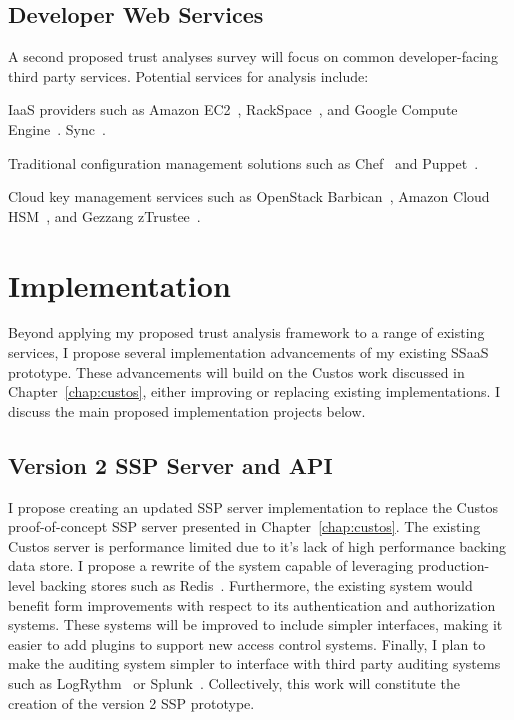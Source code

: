 \subsection{Developer Web Services}

A second proposed trust analyses survey will focus on common
developer-facing third party services. Potential services for analysis
include:

\begin{packed_item}
\item IaaS providers such as Amazon EC2~\cite{amazon-ec2},
  RackSpace~\cite{rackspace-compute}, and Google Compute
  Engine~\cite{google-compute}.  Sync~\cite{bittorrent-sync}.
\item Traditional configuration management solutions such as
  Chef~\cite{chef} and Puppet~\cite{puppet}.
\item Cloud key management services such as OpenStack
  Barbican~\cite{openstack-barbican}, Amazon Cloud
  HSM~\cite{amazon-hsm}, and Gezzang zTrustee~\cite{gazzang}.
\end{packed_item}

\section{Implementation}
\label{chap:planned:implement}

Beyond applying my proposed trust analysis framework to a range of
existing services, I propose several implementation advancements of my
existing SSaaS prototype. These advancements will build on the Custos
work discussed in Chapter~\ref{chap:custos}, either improving or
replacing existing implementations. I discuss the main proposed
implementation projects below.

\subsection{Version 2 SSP Server and API}

I propose creating an updated SSP server implementation to replace the
Custos proof-of-concept SSP server presented in
Chapter~\ref{chap:custos}. The existing Custos server is performance
limited due to it's lack of high performance backing data store. I
propose a rewrite of the system capable of leveraging production-level
backing stores such as Redis~\cite{redis}. Furthermore, the existing
system would benefit form improvements with respect to its
authentication and authorization systems. These systems will be
improved to include simpler interfaces, making it easier to add
plugins to support new access control systems. Finally, I plan to make
the auditing system simpler to interface with third party auditing
systems such as LogRythm~\cite{logrythm} or
Splunk~\cite{splunk}. Collectively, this work will constitute the
creation of the version 2 SSP prototype.


